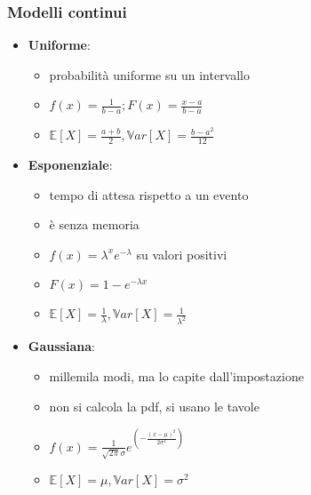 \documentclass{beamer}
\begin{document}
\begin{frame}[fragile]
	\frametitle{Modelli continui}

	\begin{itemize}
		\item \textbf{Uniforme}: \begin{itemize}
			      \item probabilità uniforme su un intervallo
			      \item $f(x) = \frac{1}{b-a}; F(x) = \frac{x-a}{b-a}$
			      \item $\mathbb{E}[X] = \frac{a+b}{2}, \mathbb{V}ar[X] = \frac{b-a^2}{12}$
		      \end{itemize}
		\item \textbf{Esponenziale}: \begin{itemize}
			      \item tempo di attesa rispetto a un evento
			      \item è senza memoria
			      \item $f(x) = \lambda^x e^{-\lambda}$ su valori positivi
			      \item $F(x) = 1 - e^{-\lambda x}$
			      \item $\mathbb{E}[X] = \frac{1}{\lambda}, \mathbb{V}ar[X] = \frac{1}{\lambda^2}$
		      \end{itemize}
		\item \textbf{Gaussiana}: \begin{itemize}
			      \item millemila modi, ma lo capite dall'impostazione
			      \item non si calcola la pdf, si usano le tavole
			      \item $f(x) = \frac{1}{\sqrt{2\pi}\sigma}e^{( -\frac{(x-\mu)^2}{2\sigma^2})}$
			      \item $\mathbb{E}[X] = \mu, \mathbb{V}ar[X] = \sigma^2$
		      \end{itemize}
	\end{itemize}
\end{frame}
\end{document}
